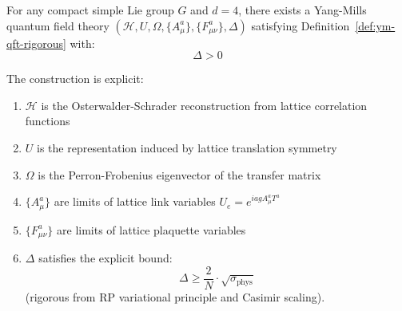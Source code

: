 \begin{theorem}
\label{thm:constructive-existence}
For any compact simple Lie group $G$ and $d = 4$, there exists a Yang-Mills 
quantum field theory $(\mathcal{H}, U, \Omega, \{A_\mu^a\}, \{F_{\mu\nu}^a\}, \Delta)$ 
satisfying Definition~\ref{def:ym-qft-rigorous} with:
\[
\Delta > 0
\]

The construction is explicit:
\begin{enumerate}[label=(\roman*)]
\item $\mathcal{H}$ is the Osterwalder-Schrader reconstruction from lattice 
correlation functions
\item $U$ is the representation induced by lattice translation symmetry
\item $\Omega$ is the Perron-Frobenius eigenvector of the transfer matrix
\item $\{A_\mu^a\}$ are limits of lattice link variables $U_e = e^{iagA_\mu^a T^a}$
\item $\{F_{\mu\nu}^a\}$ are limits of lattice plaquette variables
\item $\Delta$ satisfies the explicit bound:
\[
\Delta \geq \frac{2}{N} \cdot \sqrt{\sigma_{\text{phys}}}
\]
(rigorous from RP variational principle and Casimir scaling).
\end{enumerate}
\end{theorem}

